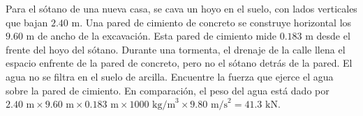 \item Para el sótano de una nueva casa, se cava un hoyo en el suelo, con lados verticales que bajan $2.40 \text{ m}$. Una pared de cimiento de concreto se construye horizontal los $9.60 \text{ m}$ de ancho de la excavación. Esta pared de cimiento mide $0.183 \text{ m}$ desde el frente del hoyo del sótano. Durante una tormenta, el drenaje de la calle llena el espacio enfrente de la pared de concreto, pero no el sótano detrás de la pared. El agua no se filtra en el suelo de arcilla. Encuentre la fuerza que ejerce el agua sobre la pared de cimiento. En comparación, el peso del agua está dado por $2.40 \text{ m} \times 9.60 \text{ m} \times 0.183 \text{ m} \times 1000 \text{ kg/m}^3 \times 9.80 \text{ m/s}^2 = 41.3 \text{ kN}$.
